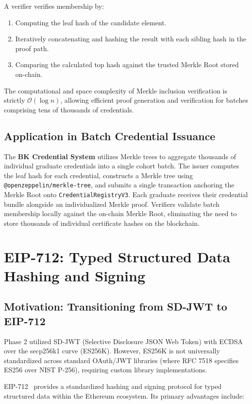 A verifier verifies membership by:
\begin{enumerate}
    \item Computing the leaf hash of the candidate element.
    \item Iteratively concatenating and hashing the result with each sibling hash in the proof path.
    \item Comparing the calculated top hash against the trusted Merkle Root stored on-chain.
\end{enumerate}

The computational and space complexity of Merkle inclusion verification is strictly $\mathcal{O}(\log n)$, allowing efficient proof generation and verification for batches comprising tens of thousands of credentials.

\subsection{Application in Batch Credential Issuance}

The \textbf{BK Credential System} utilizes Merkle trees to aggregate thousands of individual graduate credentials into a single cohort batch. The issuer computes the leaf hash for each credential, constructs a Merkle tree using \texttt{@openzeppelin/merkle-tree}, and submits a single transaction anchoring the Merkle Root onto \texttt{CredentialRegistryV3}. Each graduate receives their credential bundle alongside an individualized Merkle proof. Verifiers validate batch membership locally against the on-chain Merkle Root, eliminating the need to store thousands of individual certificate hashes on the blockchain.

\section{EIP-712: Typed Structured Data Hashing and Signing}

\subsection{Motivation: Transitioning from SD-JWT to EIP-712}

Phase 2 utilized SD-JWT (Selective Disclosure JSON Web Token) with ECDSA over the secp256k1 curve (ES256K). However, ES256K is not universally standardized across standard OAuth/JWT libraries (where RFC 7518 specifies ES256 over NIST P-256), requiring custom library implementations.

EIP-712~\cite{EIP712} provides a standardized hashing and signing protocol for typed structured data within the Ethereum ecosystem. Its primary advantages include:

